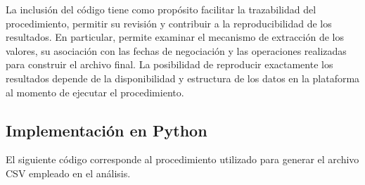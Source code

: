 \documentclass[11pt,letterpaper]{article}
\theoremstyle{plain}
\theoremstyle{definition}
\theoremstyle{remark}
\numberwithin{equation}{section}
\begin{document}
\vspace{0.2cm}


La inclusión del código tiene como propósito facilitar
la trazabilidad del procedimiento, permitir su revisión
y contribuir a la reproducibilidad de los resultados.
En particular, permite examinar el mecanismo de extracción
de los valores, su asociación con las fechas de negociación
y las operaciones realizadas para construir el archivo final.
La posibilidad de reproducir exactamente los resultados
depende de la disponibilidad y estructura de los datos
en la plataforma al momento de ejecutar el procedimiento.

\vspace{0.3cm}

\subsection{Implementación en Python}
\label{ap:implementacion_python}


El siguiente código corresponde al procedimiento utilizado
para generar el archivo CSV empleado en el análisis.

\vspace{0.2cm}
\end{document}
